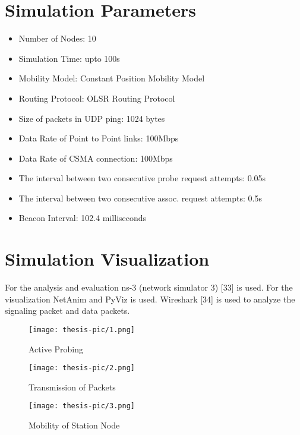 \documentclass[12pt,a4paper]{report}
\begin{document}
\section{Simulation Parameters}
\begin{itemize}
\item 
Number of Nodes: 10
\item 
Simulation Time: upto 100s
\item 
Mobility Model: Constant Position Mobility Model
\item 
Routing Protocol: OLSR Routing Protocol
\item 
Size of packets in UDP ping: 1024 bytes
\item 
Data Rate of Point to Point links: 100Mbps
\item 
Data Rate of CSMA connection: 100Mbps
\item 
The interval between two consecutive probe request attempts: 0.05s
\item 
The interval between two consecutive assoc. request attempts: 0.5s
\item 
Beacon Interval: 102.4 milliseconds
\end{itemize}
\section{Simulation Visualization}
For the analysis and evaluation ns-3 (network simulator 3) [33] is used. For the visualization NetAnim and PyViz is used. Wireshark [34] is used to analyze the signaling packet and data packets.

\begin{center}
\begin{figure}[H]
\centering
\texttt{[image: thesis-pic/1.png]}
\caption{Active Probing}
\end{figure}
\end{center}

\begin{center}
\begin{figure}[H]
\centering
\texttt{[image: thesis-pic/2.png]}
\caption{Transmission of Packets}
\end{figure}
\end{center}

\begin{center}
\begin{figure}[H]
\centering
\texttt{[image: thesis-pic/3.png]}
\caption{Mobility of Station Node}
\end{figure}
\end{center}
\end{document}
